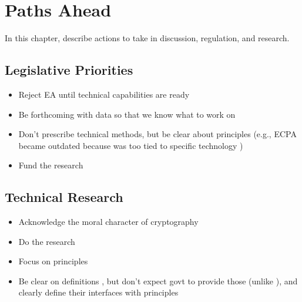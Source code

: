 \chapter{Paths Ahead}
\label{chap-pathsahead}

In this chapter, describe actions to take in discussion, regulation, and research.

\section{Legislative Priorities}

\begin{itemize}
    \item Reject EA until technical capabilities are ready \cite{varia_2018}
    \item Be forthcoming with data so that we know what to work on \cite{devlin_2018}
    \item Don't prescribe technical methods, but be clear about principles \cite{matyas_incommensurability_2018}
        (e.g., ECPA became outdated because was too tied to specific technology \cite{shamsi_2011})
    \item Fund the research \cite{varia_2018}
\end{itemize}

\section{Technical Research}

\begin{itemize}
    \item Acknowledge the moral character of cryptography \cite{rogaway_moral_2015}
    \item Do the research
    \item Focus on principles \cite{levy_robinson_2018}
    \item Be clear on definitions \cite{varia_2018}, but don't expect govt to provide those (unlike
            \cite{abelson_2015}), and clearly define their interfaces with principles
            \cite{matyas_incommensurability_2018}
\end{itemize}

